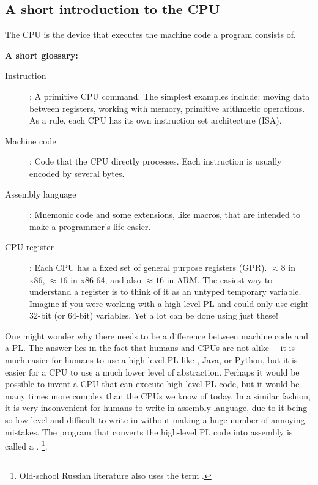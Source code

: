 \subsection{A short introduction to the CPU}

The \ac{CPU} is the device that executes the machine code a program consists of.

\textbf{A short glossary:}

\begin{description}
\item[Instruction]: A primitive \ac{CPU} command.
The simplest examples include: moving data between registers, working with memory, primitive arithmetic operations.
As a rule, each \ac{CPU} has its own instruction set architecture (\ac{ISA}).

\item[Machine code]: Code that the \ac{CPU} directly processes.
Each instruction is usually encoded by several bytes.
\item[Assembly language]: Mnemonic code and some extensions, like macros, that are intended to make a programmer's life easier.
\item[CPU register]: Each \ac{CPU} has a fixed set of general purpose registers (\ac{GPR}).
$\approx 8$ in x86, $\approx 16$ in x86-64, and also $\approx 16$ in ARM.
The easiest way to understand a register is to think of it as an untyped temporary variable.
Imagine if you were working with a high-level \ac{PL} and could only use eight 32-bit (or 64-bit) variables.
Yet a lot can be done using just these!
\end{description}


One might wonder why there needs to be a difference between machine code and a \ac{PL}.  The answer lies in the fact that humans and \ac{CPU}s are not alike---%
it is much easier for humans to use a high-level \ac{PL} like \CCpp, Java, or Python, but it is easier for a \ac{CPU} to use a much lower level of abstraction.
Perhaps it would be possible to invent a \ac{CPU} that can execute high-level \ac{PL} code, but it would be many times more complex than the \ac{CPU}s we know of today.
In a similar fashion, it is very inconvenient for humans to write in assembly language, due to it being so low-level and difficult to write in without making a huge number of annoying mistakes.
The program that converts the high-level \ac{PL} code into assembly is called a .
\footnote{Old-school Russian literature also uses the term .}.

